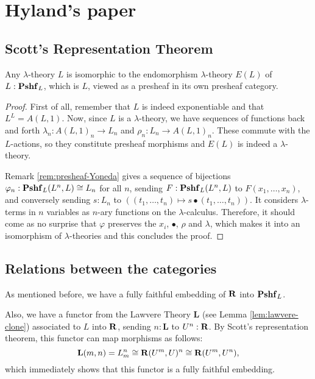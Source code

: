 \chapter{Hyland's paper}


\section{Scott's Representation Theorem}
\begin{theorem}\label{thm:representation-theorem}
  Any $ \lambda $-theory $ L $ is isomorphic to the endomorphism $ \lambda $-theory $ E(L) $ of $ L: \mathbf{Pshf}_{L} $, which is $ L $, viewed as a presheaf in its own presheaf category.
\end{theorem}
\begin{proof}
  First of all, remember that $ L $ is indeed exponentiable and that $ L^L = A(L, 1) $.
  Now, since $ L $ is a $ \lambda $-theory, we have sequences of functions back and forth $ \lambda_n: A(L, 1)_n \to L_n $ and $ \rho_n: L_n \to A(L, 1)_n $. These commute with the $ L $-actions, so they constitute presheaf morphisms and $ E(L) $ is indeed a $ \lambda $-theory.

  Remark \ref{rem:presheaf-Yoneda} gives a sequence of bijections $ \varphi_n : \mathbf{Pshf}_{L}(L^n, L) \cong L_n $ for all $ n $, sending $ F: \mathbf{Pshf}_{L}(L^n, L) $ to $ F(x_1, \dots, x_n) $, and conversely sending $ s: L_n $ to $ ((t_1, \dots, t_n) \mapsto s \bullet (t_1, \dots, t_n)) $. It considers $ \lambda $-terms in $ n $ variables as $ n $-ary functions on the $ \lambda $-calculus. Therefore, it should come as no surprise that $ \varphi $ preserves the $ x_i $, $ \bullet $, $ \rho $ and $ \lambda $, which makes it into an isomorphism of $ \lambda $-theories and this concludes the proof.
\end{proof}

\section{Relations between the categories}

As mentioned before, we have a fully faithful embedding of $ \mathbf{R} $ into $ \mathbf{Pshf}_{L} $.

Also, we have a functor from the Lawvere Theory $ \mathbf{L} $ (see Lemma \ref{lem:lawvere-clone}) associated to $ L $ into $ \mathbf{R} $, sending $ n : \mathbf L $ to $ U^n : \mathbf{R} $. By Scott's representation theorem, this functor can map morphisms as follows:
\[ \mathbf L(m, n) = L_m^n \cong \mathbf{R}(U^m, U)^n \cong \mathbf{R}(U^m, U^n), \]
which immediately shows that this functor is a fully faithful embedding.

